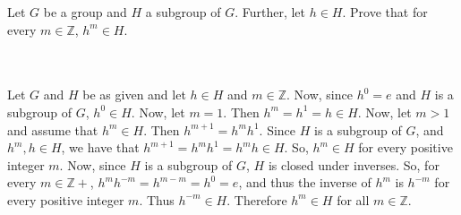 Let $G$ be a group and $H$ a subgroup of $G$. Further, let $h\in H$. Prove that for every
$m\in\mathbb{Z}$, $h^m\in H$.\\\\

\begin{solution}\renewcommand{\qedsymbol}{}\ \\
    Let $G$ and $H$ be as given and let $h\in H$ and $m\in\mathbb{Z}$. Now, since $h^0=e$ and $H$ is a
    subgroup of $G$, $h^0\in H$. Now, let $m=1$. Then $h^m=h^1=h\in H$. Now, let $m>1$ and assume that
    $h^m\in H$. Then $h^{m+1}=h^mh^1$. Since $H$ is a subgroup of $G$, and $h^m,h\in H$, we have that
    $h^{m+1}=h^mh^1=h^mh\in H$. So, $h^m\in H$ for every positive integer $m$. Now, since $H$ is a
    subgroup of $G$, $H$ is closed under inverses. So, for every $m\in\mathbb{Z}+$,
    $h^mh^{-m}=h^{m-m}=h^0=e$, and thus the inverse of $h^m$ is $h^{-m}$ for every positive integer $m$.
    Thus $h^{-m}\in H$. Therefore $h^m\in H$ for all $m\in\mathbb{Z}$.

\end{solution}